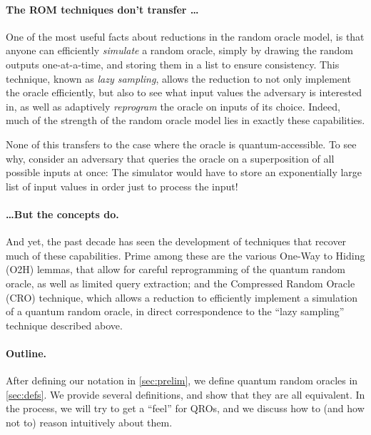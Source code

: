   \paragraph{The ROM techniques don't transfer \ldots}
    One of the most useful facts about reductions in the random oracle model,
      is that anyone can efficiently \emph{simulate} a random oracle, simply by
      drawing the random outputs one-at-a-time, and storing them in a list to
      ensure consistency. This technique, known as \emph{lazy sampling}, allows
      the reduction to not only implement the oracle efficiently, but also to
      see what input values the adversary is interested in, as well as
      adaptively \emph{reprogram} the oracle on inputs of its choice.
      Indeed, much of the strength of the random oracle model lies in exactly
      these capabilities.

    None of this transfers to the case where the oracle is quantum-accessible.
      To see why, consider an adversary that queries the oracle on a
      superposition of all possible inputs at once: The simulator would have to
      store an exponentially large list of input values in order just to process the
      input!

  \paragraph{\ldots But the concepts do.}
    And yet, the past decade has seen the development of techniques that
      recover much of these capabilities. Prime among these are the various
      One-Way to Hiding (O2H) lemmas, that allow for careful reprogramming of
      the quantum random oracle, as well as limited query extraction; and the
      Compressed Random Oracle (CRO) technique, which allows a reduction to
      efficiently implement a simulation of a quantum random oracle, in direct
      correspondence to the ``lazy sampling'' technique described above.

  \paragraph{Outline.}
    After defining our notation in \autoref{sec:prelim}, we define quantum
      random oracles in \autoref{sec:defs}. We provide several definitions, and
      show that they are all equivalent. In the process, we will try to get a
      ``feel'' for QROs, and we discuss how to (and how not to) reason
      intuitively about them.

